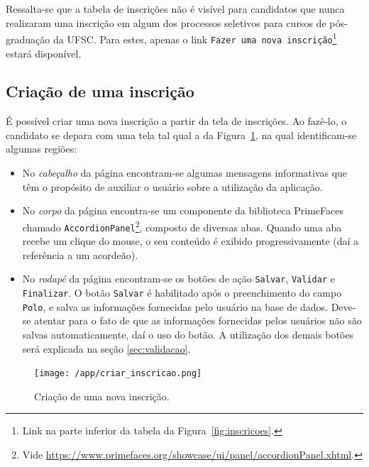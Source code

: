\documentclass[
  10.5pt,				  %
	openright,			%
	twoside,			  %
  a5paper,
  chapter=TITLE,	%
	section=TITLE,	%
  hyphens,        %
	english,        %
	brazil          %
]{abntex2}
\begin{document}
Ressalta-se que a tabela de inscrições não é visível para candidatos que nunca realizaram uma inscrição em algum dos processos seletivos para cursos de pós-graduação da UFSC. Para estes, apenas o link \texttt{Fazer uma nova inscrição}\footnote{Link na parte inferior da tabela da Figura~\ref{fig:inscricoes}.} estará disponível.


\subsection{Criação de uma inscrição}\label{sec:criacao_inscricao}

É possível criar uma nova inscrição a partir da tela de inscrições. Ao fazê-lo, o candidato se depara com uma tela tal qual a da Figura~\ref{fig:criar_inscricao}, na qual identificam-se algumas regiões:

\begin{itemize}
  \item No \emph{cabeçalho} da página encontram-se algumas mensagens informativas que têm o propósito de auxiliar o usuário sobre a utilização da aplicação.
  \item No \emph{corpo} da página encontra-se um componente da biblioteca PrimeFaces chamado \texttt{AccordionPanel}\footnote{Vide \href{https://www.primefaces.org/showcase/ui/panel/accordionPanel.xhtml}{https://www.primefaces.org/showcase/ui/panel/accordionPanel.xhtml}.}, composto de diversas abas. Quando uma aba recebe um clique do mouse, o seu conteúdo é exibido progressivamente (daí a referência a um acordeão).
  \item No \emph{rodapé} da página encontram-se os botões de ação \texttt{Salvar}, \texttt{Validar} e \texttt{Finalizar}. O botão \texttt{Salvar} é habilitado após o preenchimento do campo \texttt{Polo}, e salva as informações fornecidas pelo usuário na base de dados. Deve-se atentar para o fato de que as informações fornecidas pelos usuários não são salvas automaticamente, daí o uso do botão. A utilização dos demais botões será explicada na seção \ref{sec:validacao}.
\end{itemize}


\begin{figure}[!ht]
  \caption{\label{fig:criar_inscricao} Criação de uma nova inscrição.}
  \begin{center}
    \texttt{[image: /app/criar\_inscricao.png]}
  \end{center}
\end{figure}
\end{document}
